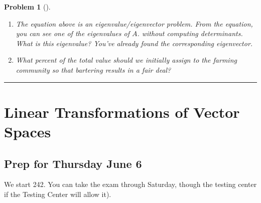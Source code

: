 \documentclass[letterpaper,oneside]{book}%
\theoremstyle{plain}
\theoremstyle{box}
\theoremstyle{problem}
\newtheorem{problemnum}{Problem}[chapter]
\newenvironment{problem}[1][]{\begin{problemnum}[#1]}{\end{problemnum}\nopagebreak\hrule\bigskip}
\begin{document}
\begin{problem}
\begin{enumerate}
$$\begin{bmatrix}
\end{bmatrix}
=
\begin{bmatrix}
 x_1\\x_2\\x_3
\end{bmatrix}
 \quad
\text{or}
\quad 
\begin{bmatrix}
   \frac{1}{2}& \frac{1}{3}& \frac{1}{2}\\
   \frac{1}{4}& \frac{1}{3}& \frac{1}{4}\\
   \frac{1}{4}& \frac{1}{3}& \frac{1}{4}
  \end{bmatrix}
\begin{bmatrix}
 x_1\\x_2\\x_3
\end{bmatrix}
-
\begin{bmatrix}
 x_1\\x_2\\x_3
\end{bmatrix}
=
\begin{bmatrix}
 0\\0\\0
\end{bmatrix}.
$$  
Solve the system. [You should obtain infinitely many solutions.]
\item The equation above is an eigenvalue/eigenvector problem.  From the equation, you can see one of the eigenvalues of $A$. without computing determinants.  What is this eigenvalue? You've already found the corresponding eigenvector. 
\item What percent of the total value should we initially assign to the farming community so that bartering results in a fair deal?
\end{enumerate}
\end{problem}












\chapter{Linear Transformations of Vector Spaces}

\section{Prep for Thursday June 6}
We start 242. You can take the exam through Saturday, though the testing center  if the Testing Center will allow it).
\end{document}
